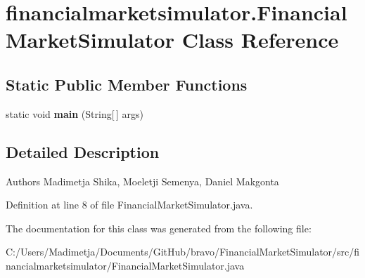 \hypertarget{classfinancialmarketsimulator_1_1_financial_market_simulator}{\section{financialmarketsimulator.\+Financial\+Market\+Simulator Class Reference}
\label{classfinancialmarketsimulator_1_1_financial_market_simulator}
}
\subsection*{Static Public Member Functions}
\begin{DoxyCompactItemize}
\item 
\hypertarget{classfinancialmarketsimulator_1_1_financial_market_simulator_a55f0112537bdd6b3fb2607dd767d2ece}{static void {\bfseries main} (String\mbox{[}$\,$\mbox{]} args)}\label{classfinancialmarketsimulator_1_1_financial_market_simulator_a55f0112537bdd6b3fb2607dd767d2ece}

\end{DoxyCompactItemize}


\subsection{Detailed Description}
\begin{DoxyAuthor}{Authors}
Madimetja Shika, Moeletji Semenya, Daniel Makgonta 
\end{DoxyAuthor}


Definition at line 8 of file Financial\+Market\+Simulator.\+java.



The documentation for this class was generated from the following file\+:\begin{DoxyCompactItemize}
\item 
C\+:/\+Users/\+Madimetja/\+Documents/\+Git\+Hub/bravo/\+Financial\+Market\+Simulator/src/financialmarketsimulator/Financial\+Market\+Simulator.\+java\end{DoxyCompactItemize}

